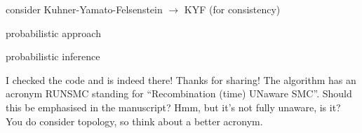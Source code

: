 \begin{point}{\revref} %
 consider Kuhner-Yamato-Felsenstein $\to$ KYF (for consistency)
\end{point}


\begin{point}{\revref} %
 probabilistic approach
\end{point}


\begin{point}{\revref} %
 probabilistic inference
\end{point}


\begin{point}{\revref} %
 I checked the code and is indeed there! Thanks for sharing! The algorithm has an acronym RUNSMC standing for ``Recombination (time) UNaware SMC''. Should this be emphasised in the manuscript? Hmm, but it's not fully unaware, is it? You do consider topology, so think about a better acronym.
\end{point}

\reply{
}


